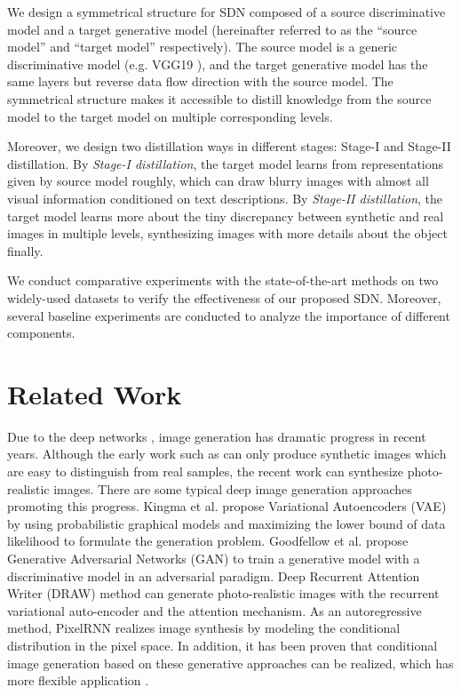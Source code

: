 \documentclass[sigconf]{acmart}
\begin{document}
We design a symmetrical structure for SDN composed of a source discriminative model and a target generative model (hereinafter referred to as the ``source model'' and ``target model'' respectively). The source model is a generic discriminative model (e.g. VGG19 \cite{simonyan2014very}), and the target generative model has the same layers but reverse data flow direction with the source model. The symmetrical structure makes it accessible to distill knowledge from the source model to the target model on multiple corresponding levels.%

Moreover, we design two distillation ways in different stages: Stage-I and Stage-II distillation. By \textit{Stage-I distillation}, the target model learns from representations given by source model roughly, which can draw blurry images with almost all visual information conditioned on text descriptions. By \textit{Stage-II distillation}, the target model learns more about the tiny discrepancy between synthetic and real images in multiple levels, synthesizing images with more details about the object finally.

We conduct comparative experiments with the state-of-the-art methods on two widely-used datasets to verify the effectiveness of our proposed SDN. Moreover, several baseline experiments are conducted to analyze the importance of different components.

\section{Related Work}

Due to the deep networks \cite{lecun2015deep}, image generation has dramatic progress in recent years. Although the early work such as \cite{mnih2010generating} can only produce synthetic images which are easy to distinguish from real samples, the recent work \cite{nguyen2016synthesizing, zhang2016stackgan, chen2017photographic} can synthesize photo-realistic images. There are some typical deep image generation approaches promoting this progress. Kingma et al. propose Variational Autoencoders (VAE) \cite{kingma2013auto} by using probabilistic graphical models and maximizing the lower bound of data likelihood to formulate the generation problem. Goodfellow et al. propose Generative Adversarial Networks (GAN) \cite{goodfellow2014generative} to train a generative model with a discriminative model in an adversarial paradigm. Deep Recurrent Attention Writer (DRAW) method \cite{gregor2015draw} can generate photo-realistic images with the recurrent variational auto-encoder and the attention mechanism. As an autoregressive method, PixelRNN \cite{oord2016pixel} realizes image synthesis by modeling the conditional distribution in the pixel space. In addition, it has been proven that conditional image generation based on these generative approaches can be realized, which has more flexible application \cite{van2016conditional, yan2016attribute2image}.
\end{document}
